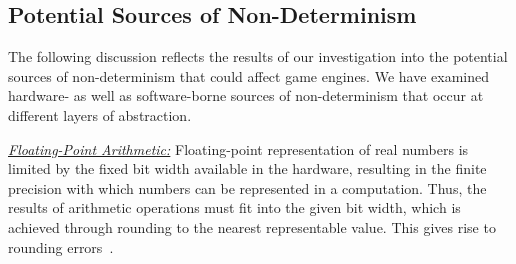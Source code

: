 \documentclass[letterpaper, 10 pt, journal, twoside]{IEEEtran}
\begin{document}




\subsection{Potential Sources of Non-Determinism} \label{s:nondeterminisimSources}

The following discussion reflects the results of our investigation into the potential sources of non-determinism that could affect game engines. We have examined hardware- as well as software-borne sources of non-determinism that occur at different layers of abstraction. 

\medskip


\noindent\underline{\textit{Floating-Point Arithmetic:}}
Floating-point representation of real numbers is limited by the fixed bit width available in the hardware, resulting in the finite precision with which numbers can be represented in a computation. 
Thus, the results of arithmetic operations must fit into the given bit width, which is achieved through rounding to the nearest representable value. This gives rise to rounding errors~\cite{FloatingPointsBook,goldberg1991every}. 
%
\end{document}
